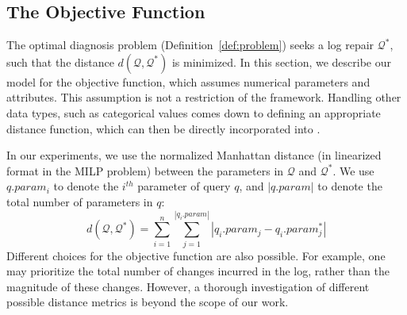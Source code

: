 
\subsection{The Objective Function}

The optimal diagnosis problem (Definition~\ref{def:problem}) seeks a
log repair $\mathcal{Q}^*$, such that the distance
$d(\mathcal{Q},\mathcal{Q}^*)$ is minimized. In this section, we
describe our model for the objective function, which assumes numerical
parameters and attributes. This assumption is not a restriction of the
\sys framework.
Handling other data types, such as categorical values comes down to defining an appropriate distance function, which can then be directly incorporated into \sys.

In our experiments, we use the normalized Manhattan
distance (in linearized format in the MILP problem) 
between the parameters in $\mathcal{Q}$ and
$\mathcal{Q}^*$. We use $q.param_i$ to denote the $i^{th}$ parameter
of query $q$, and $|q.param|$ to denote the total number of parameters
in $q$: \[d(\mathcal{Q}, \mathcal{Q}^*) = \sum_{i = 1} ^{n} \sum_{j =
1}^{|q_i.param|} |q_i.param_j - q_i.param_j^*|\]
% 
Different choices for the objective function are also possible. For
example, one may prioritize the total number of changes incurred in
the log, rather than the magnitude of these changes. However, a
thorough investigation of different possible distance metrics is
beyond the scope of our work.

